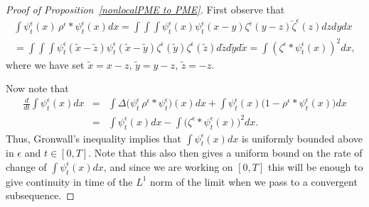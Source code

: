 \documentclass[EJP]{ejpecp} %
\renewcommand{\tilde}{\widetilde}
\begin{document}
\begin{proof}[Proof of Proposition~\ref{nonlocalPME to PME}]
First observe that
\begin{multline*}
	\int \psi_t^\epsilon(x)\, \rho^{\epsilon}*\psi_t^\epsilon(x) dx 
=
\int\int\int \psi_t^\epsilon(x)\psi_t^\epsilon(x-y)\zeta^{\epsilon}(y-z)
\check{\zeta}^{\epsilon}(z) dz dy dx 
\\
=
\int\int\int \psi_t^\epsilon(\tilde{x}-\tilde{z})
\psi_t^\epsilon(\tilde{x}-\tilde{y})
\zeta^{\epsilon}(\tilde{y})
\zeta^{\epsilon}(\tilde{z}) d\tilde{z} d\tilde{y} d \tilde{x}
	=\int\left(\zeta^{\epsilon}*\psi_t^\epsilon(x)\right)^2 dx,
\end{multline*}
where we have set $\tilde{x}=x-z$, $\tilde{y}=y-z$, $\tilde{z}=-z$.

Now note that
\begin{eqnarray*}
\frac{d}{dt}\int \psi_t^\epsilon (x) dx
	&=&
\int \Delta \big(\psi_t^\epsilon \, \rho^{\epsilon}*\psi_t^\epsilon\big)(x) dx 
	+\int \psi_t^\epsilon(x)\big(1-\rho^{\epsilon}*\psi_t^\epsilon(x)\big) dx
\\	
&=&
 \int \psi_t^\epsilon (x) d x
	-\int \big(\zeta^{\epsilon}*\psi_t^\epsilon(x)\big)^2  dx.
\end{eqnarray*}
Thus, Gronwall's inequality implies that $\int \psi_t^\epsilon(x) dx$ is uniformly bounded above in
$\epsilon$ and $t\in [0,T]$. Note that this also then gives a uniform
bound on the rate of change of $\int \psi_t^\epsilon (x) d x$, and since
we are working on $[0,T]$ this will be enough to give continuity in time of the
$L^1$ norm of the limit
when we pass to a convergent subsequence.


\end{proof}
\end{document}
